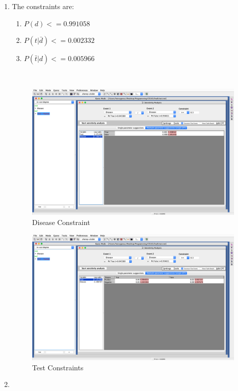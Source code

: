 \documentclass{article}
\begin{document}
\begin{enumerate}
	\item The constraints are: 
				\begin{enumerate}
					\item $P(d) <= 0.991058$
					\item $P(t | \bar d) <= 0.002332$
					\item $P(\bar t | d) <= 0.005966$
				\end{enumerate} \
		\begin{figure}[H]
			\centering
			\includegraphics[width=\linewidth]{diseaseweight.png}
			\caption{Disease Constraint}
			\label{fig:dis}
		\end{figure}
		\begin{figure}[H]
			\centering
			\includegraphics[width=\linewidth]{testweight.png}
			\caption{Test Constraints}
			\label{fig:test}
		\end{figure}
	\clearpage
	\item \begin{enumerate}

\end{enumerate}
\end{enumerate}
\end{document}
